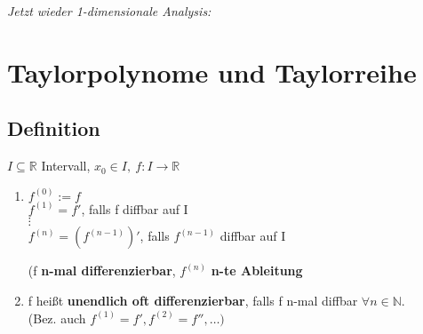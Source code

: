 
\vspace*{0.5cm}
\hspace*{1cm}
\emph{Jetzt wieder 1-dimensionale Analysis:}
\section{Taylorpolynome und Taylorreihe}

\subsection{Definition}
$I\subseteq \mathbb{R}$ Intervall, $x_0\in I, \ f:I\rightarrow\mathbb{R}$
\begin{enumerate}
	\item
	$f^{(0)}:=f$\\
	$f^{(1)}=f'$, falls f diffbar auf I\\
	$\vdots$\\
	$f^{(n)}=(f^{(n-1)})'$, falls $f^{(n-1)}$ diffbar auf I
	
	(f \textbf{n-mal differenzierbar}, $f^{(n)}$ \textbf{n-te Ableitung}
	
	\item
	f heißt \textbf{unendlich oft differenzierbar}, falls f n-mal diffbar $\forall n\in\mathbb{N}$.\\
	(Bez. auch $f^{(1)}=f',f^{(2)}=f'',\dots)$
\end{enumerate}

